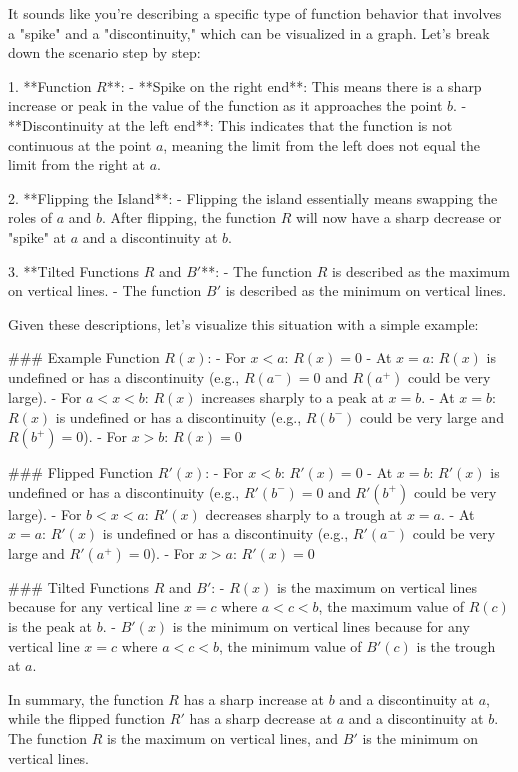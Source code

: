 It sounds like you're describing a specific type of function behavior that involves a "spike" and a "discontinuity," which can be visualized in a graph. Let's break down the scenario step by step:

1. **Function \( R \)**:
   - **Spike on the right end**: This means there is a sharp increase or peak in the value of the function as it approaches the point \( b \).
   - **Discontinuity at the left end**: This indicates that the function is not continuous at the point \( a \), meaning the limit from the left does not equal the limit from the right at \( a \).

2. **Flipping the Island**:
   - Flipping the island essentially means swapping the roles of \( a \) and \( b \). After flipping, the function \( R \) will now have a sharp decrease or "spike" at \( a \) and a discontinuity at \( b \).

3. **Tilted Functions \( R \) and \( B' \)**:
   - The function \( R \) is described as the maximum on vertical lines.
   - The function \( B' \) is described as the minimum on vertical lines.

Given these descriptions, let's visualize this situation with a simple example:

### Example Function \( R(x) \):
- For \( x < a \): \( R(x) = 0 \)
- At \( x = a \): \( R(x) \) is undefined or has a discontinuity (e.g., \( R(a^-) = 0 \) and \( R(a^+) \) could be very large).
- For \( a < x < b \): \( R(x) \) increases sharply to a peak at \( x = b \).
- At \( x = b \): \( R(x) \) is undefined or has a discontinuity (e.g., \( R(b^-) \) could be very large and \( R(b^+) = 0 \)).
- For \( x > b \): \( R(x) = 0 \)

### Flipped Function \( R'(x) \):
- For \( x < b \): \( R'(x) = 0 \)
- At \( x = b \): \( R'(x) \) is undefined or has a discontinuity (e.g., \( R'(b^-) = 0 \) and \( R'(b^+) \) could be very large).
- For \( b < x < a \): \( R'(x) \) decreases sharply to a trough at \( x = a \).
- At \( x = a \): \( R'(x) \) is undefined or has a discontinuity (e.g., \( R'(a^-) \) could be very large and \( R'(a^+) = 0 \)).
- For \( x > a \): \( R'(x) = 0 \)

### Tilted Functions \( R \) and \( B' \):
- \( R(x) \) is the maximum on vertical lines because for any vertical line \( x = c \) where \( a < c < b \), the maximum value of \( R(c) \) is the peak at \( b \).
- \( B'(x) \) is the minimum on vertical lines because for any vertical line \( x = c \) where \( a < c < b \), the minimum value of \( B'(c) \) is the trough at \( a \).

In summary, the function \( R \) has a sharp increase at \( b \) and a discontinuity at \( a \), while the flipped function \( R' \) has a sharp decrease at \( a \) and a discontinuity at \( b \). The function \( R \) is the maximum on vertical lines, and \( B' \) is the minimum on vertical lines.